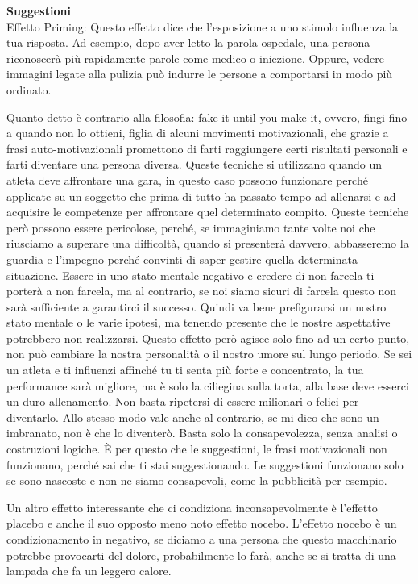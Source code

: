 \documentclass[12pt]{book} %
\begin{document}
\noindent \textbf{\large Suggestioni} \\
Effetto Priming: Questo effetto dice che
l'esposizione a uno stimolo influenza la tua risposta.
Ad esempio, dopo aver letto la parola ospedale, una persona riconoscerà più rapidamente parole come medico o iniezione. Oppure, vedere immagini legate alla pulizia può indurre le persone a comportarsi in modo più ordinato.

Quanto detto è contrario alla filosofia: fake it until you make it, ovvero, fingi fino a quando non lo ottieni, figlia
di alcuni movimenti motivazionali, che grazie a frasi auto-motivazionali promettono di farti raggiungere certi risultati
personali e farti diventare una persona diversa. Queste tecniche si
utilizzano quando un atleta deve affrontare una gara, in questo caso possono funzionare perché applicate su un soggetto che prima di tutto ha passato tempo ad allenarsi e ad acquisire le competenze per affrontare quel determinato compito. Queste tecniche però possono essere pericolose, perché, se
immaginiamo tante volte noi che riusciamo a superare una difficoltà, quando si presenterà davvero, abbasseremo la
guardia e l'impegno perché convinti di saper gestire quella determinata situazione. Essere in uno
stato mentale negativo e credere di non farcela ti porterà a non farcela, ma al contrario, se noi siamo sicuri di
farcela questo non sarà sufficiente a garantirci il successo. Quindi va bene prefigurarsi un nostro stato mentale o le
varie ipotesi, ma tenendo presente che le nostre aspettative potrebbero non realizzarsi. Questo effetto però
agisce solo fino ad un certo punto, non può cambiare la nostra personalità o il nostro umore sul lungo periodo. Se sei
un atleta e ti influenzi affinché tu ti senta più forte e concentrato, la tua performance sarà migliore, ma è solo la
ciliegina sulla torta, alla base deve esserci un duro allenamento. Non basta ripetersi di essere milionari o felici
per diventarlo. Allo stesso modo vale anche al contrario, se mi dico che sono un imbranato, non è che lo diventerò.
Basta solo la consapevolezza, senza analisi o costruzioni logiche. È per questo che le suggestioni, le frasi
motivazionali non funzionano, perché sai che ti stai suggestionando. Le suggestioni funzionano solo se sono nascoste e
non ne siamo consapevoli, come la pubblicità per esempio. 

Un altro effetto interessante che ci condiziona inconsapevolmente è l'effetto placebo e anche il
suo opposto meno noto effetto nocebo. L'effetto nocebo è un condizionamento in negativo, se
diciamo a una persona che questo macchinario potrebbe provocarti del dolore, probabilmente lo farà, anche se si tratta
di una lampada che fa un leggero calore.
\end{document}
